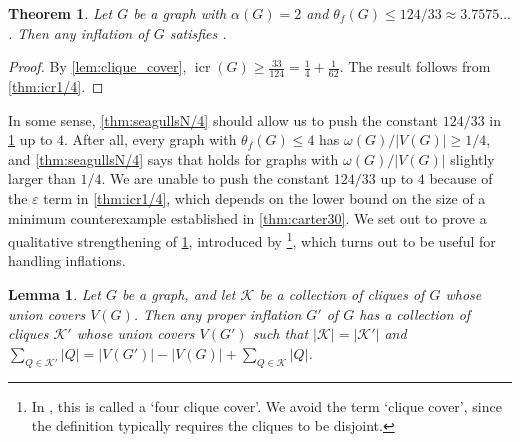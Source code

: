 \documentclass[11pt]{article}
\numberwithin{equation}{section}
\theoremstyle{plain}
\newtheorem{thm}[equation]{Theorem}
\newtheorem{lem}[equation]{Lemma}
\theoremstyle{definition}
\renewcommand{\geq}{\geqslant}
\renewcommand{\leq}{\leqslant}
\DeclareMathOperator{\icr}{icr}
\begin{document}
\begin{thm}
    \label{thm:124/33}
    Let $G$ be a graph with $\alpha(G) = 2$ and $\theta_f(G) \leq 124/33 \approx 3.7575\dots$. Then any inflation of $G$ satisfies .
\end{thm}
\begin{proof}
    By \cref{lem:clique_cover}, $\icr(G) \geq \frac{33}{124} = \frac{1}{4} + \frac{1}{62}$. The result follows from \cref{thm:icr1/4}.
\end{proof}
In some sense, \cref{thm:seagullsN/4} should allow us to push the constant $124/33$ in \cref{thm:124/33} up to $4$. After all, every graph with $\theta_f(G) \leq 4$ has $\omega(G)/|V(G)| \geq 1/4$, and \cref{thm:seagullsN/4} says that  holds for graphs with $\omega(G) / |V(G)|$ slightly larger than $1/4$.
We are unable to push the constant $124/33$ up to $4$ because of the $\varepsilon$ term in \cref{thm:icr1/4}, which depends on the lower bound on the size of a minimum counterexample established in \cref{thm:carter30}.
We set out to prove a qualitative strengthening of \cref{thm:124/33}, introduced by \citet{Carter22}\footnote{In \citet{Carter22}, this is called a `four clique cover'. We avoid the term `clique cover', since the definition typically requires the cliques to be disjoint.}, which turns out to be useful for handling inflations.
\begin{lem}
    \label{lem:cc2}
    Let $G$ be a graph, and let $\mathcal{K}$ be a collection of cliques of $G$ whose union covers $V(G)$. Then any proper inflation $G'$ of $G$ has a collection of cliques $\mathcal{K}'$ whose union covers $V(G')$ such that $|\mathcal{K}| = |\mathcal{K}'|$ and $\sum_{Q \in \mathcal{K'}} |Q| = |V(G')| - |V(G)| + \sum_{Q \in \mathcal{K}} |Q|$.
\end{lem}
\end{document}
